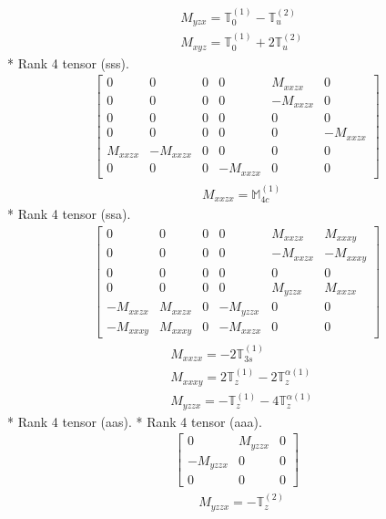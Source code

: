 \documentclass[fleqn,8pt,landscape]{jsarticle}
\begin{document}
\begin{align*}
& M_{yzx} = \mathbb{T}_{0}^{(1)} - \mathbb{T}_{u}^{(2)} \\
& M_{xyz} = \mathbb{T}_{0}^{(1)} + 2 \mathbb{T}_{u}^{(2)}
\end{align*}
* Rank 4 tensor (sss).
\begin{align*}
\begin{bmatrix} 0 & 0 & 0 & 0 & M_{xxzx} & 0 \\ 0 & 0 & 0 & 0 & - M_{xxzx} & 0 \\ 0 & 0 & 0 & 0 & 0 & 0 \\ 0 & 0 & 0 & 0 & 0 & - M_{xxzx} \\ M_{xxzx} & - M_{xxzx} & 0 & 0 & 0 & 0 \\ 0 & 0 & 0 & - M_{xxzx} & 0 & 0 \end{bmatrix}
\end{align*}
\begin{align*}
& M_{xxzx} = \mathbb{M}_{4c}^{(1)}
\end{align*}
* Rank 4 tensor (ssa).
\begin{align*}
\begin{bmatrix} 0 & 0 & 0 & 0 & M_{xxzx} & M_{xxxy} \\ 0 & 0 & 0 & 0 & - M_{xxzx} & - M_{xxxy} \\ 0 & 0 & 0 & 0 & 0 & 0 \\ 0 & 0 & 0 & 0 & M_{yzzx} & M_{xxzx} \\ - M_{xxzx} & M_{xxzx} & 0 & - M_{yzzx} & 0 & 0 \\ - M_{xxxy} & M_{xxxy} & 0 & - M_{xxzx} & 0 & 0 \end{bmatrix}
\end{align*}
\begin{align*}
& M_{xxzx} = - 2 \mathbb{T}_{3s}^{(1)} \\
& M_{xxxy} = 2 \mathbb{T}_{z}^{(1)} - 2 \mathbb{T}_{z}^{\alpha(1)} \\
& M_{yzzx} = - \mathbb{T}_{z}^{(1)} - 4 \mathbb{T}_{z}^{\alpha(1)}
\end{align*}
* Rank 4 tensor (aas).
* Rank 4 tensor (aaa).
\begin{align*}
\begin{bmatrix} 0 & M_{yzzx} & 0 \\ - M_{yzzx} & 0 & 0 \\ 0 & 0 & 0 \end{bmatrix}
\end{align*}
\begin{align*}
& M_{yzzx} = - \mathbb{T}_{z}^{(2)}
\end{align*}
\end{document}
